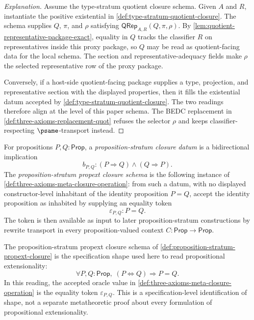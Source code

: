 \begin{proof}[Explanation]
Assume the type-stratum quotient closure schema. Given $A$ and $R$, instantiate the positive existential in \autoref{def:type-stratum-quotient-closure}. The schema supplies $Q$, $\pi$, and $\rho$ satisfying $\mathsf{QRep}_{A,R}(Q,\pi,\rho)$. By \autoref{lem:quotient-representative-package-exact}, equality in $Q$ tracks the classifier $R$ on representatives inside this proxy package, so $Q$ may be read as quotient-facing data for the local schema. The section and representative-adequacy fields make $\rho$ the selected representative row of the proxy package.

Conversely, if a host-side quotient-facing package supplies a type, projection, and representative section with the displayed properties, then it fills the existential datum accepted by \autoref{def:type-stratum-quotient-closure}. The two readings therefore align at the level of this paper schema. The BEDC replacement in \autoref{def:three-axioms-replacement-quot} refuses the selector $\rho$ and keeps classifier-respecting $\psame$-transport instead.
\end{proof}

\begin{definition}
\label{def:proposition-stratum-propext-closure}
For propositions $P,Q:\mathsf{Prop}$, a \emph{proposition-stratum closure datum} is a bidirectional implication
$$
b_{P,Q}:(P\Rightarrow Q)\land(Q\Rightarrow P).
$$
The \emph{proposition-stratum propext closure schema} is the following instance of \autoref{def:three-axioms-meta-closure-operation}: from such a datum, with no displayed constructor-level inhabitant of the identity proposition $P=Q$, accept the identity proposition as inhabited by supplying an equality token
$$
\varepsilon_{P,Q}:P=Q.
$$
The token is then available as input to later proposition-stratum constructions by rewrite transport in every proposition-valued context $C:\mathsf{Prop}\to\mathsf{Prop}$.
\end{definition}

\begin{principle}
\label{thm:propext-proposition-stratum-meta-closure}
The proposition-stratum propext closure schema of \autoref{def:proposition-stratum-propext-closure} is the specification shape used here to read propositional extensionality:
$$
\forall P,Q:\mathsf{Prop},\; (P\Leftrightarrow Q)\Rightarrow P=Q.
$$
In this reading, the accepted oracle value in \autoref{def:three-axioms-meta-closure-operation} is the equality token $\varepsilon_{P,Q}$. This is a specification-level identification of shape, not a separate metatheoretic proof about every formulation of propositional extensionality.
\end{principle}

